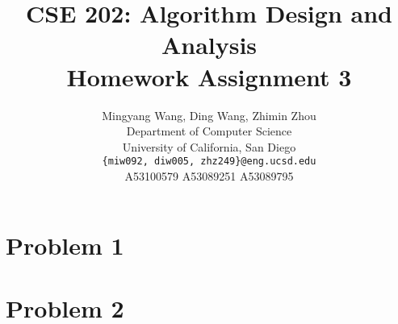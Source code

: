 \documentclass{article} %
\title{CSE 202: Algorithm Design and Analysis \\ Homework Assignment 3}
\author{
  Mingyang Wang, Ding Wang, Zhimin Zhou\\
  Department of Computer Science\\
  University of California, San Diego\\
  \texttt{\{miw092, diw005, zhz249\}@eng.ucsd.edu}\\
  A53100579 A53089251 A53089795\\
}
\begin{document}
\maketitle
\section*{Problem 1}


\newpage
\section*{Problem 2}
\end{document}
